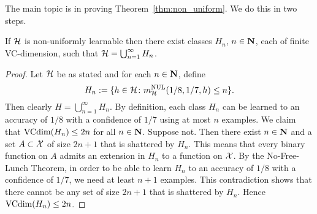 The main topic is in proving Theorem~\ref{thm:non_uniform}. We do this in two steps.
\begin{lemma}\label{lemma:if_side}
If $\mathcal{H}$ is non-uniformly learnable then there exist classes $H_n$, $n \in \mathbf{N}$, each
of finite VC-dimension, such that $\mathcal{H} = \bigcup_{n = 1}^{\infty} H_n$.
\end{lemma}
\begin{proof}
Let $\mathcal{H}$ be as stated and for each $n \in \mathbf{N}$, define
\[
    H_n := \{h \in \mathcal{H} \colon m_{\mathcal{H}}^{\text{NUL}} (1/8, 1/7, h) \leq n\}.
\]
Then clearly $H = \bigcup_{n = 1}^{\infty} H_n$. By definition, each class $H_n$ 
can be learned to an accuracy of $1/8$ with a confidence of $1/7$ using at most $n$
examples. We claim that $\text{VCdim} (H_n) \leq 2n$ for all 
$n \in \mathbf{N}$. Suppose not. Then there exist $n \in \mathbf{N}$ and a set $A \subset \mathcal{X}$ of size 
$2n + 1$ that is shattered by $H_n$. This means that every binary function on $A$ admits 
an extension in $H_n$ to a function on $\mathcal{X}$. By the No-Free-Lunch Theorem, in order 
to be able to learn $H_n$ to an accuracy of $1/8$ with a confidence of $1/7$, we need 
at least $n + 1$ examples. This contradiction shows that there cannot be any set 
of size $2n + 1$ that is shattered by $H_n$. Hence $\text{VCdim} (H_n) \leq 2n$.
\qedhere
\end{proof}

